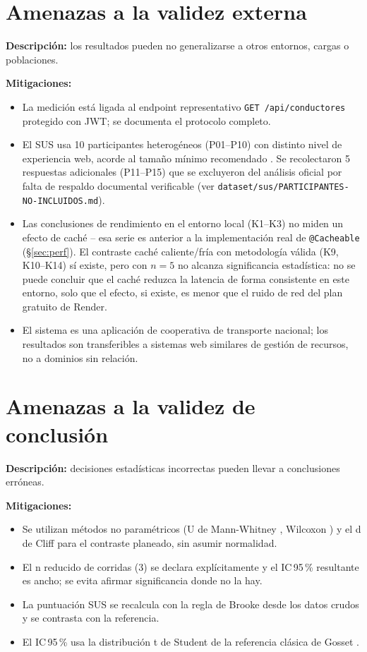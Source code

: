 \section{Amenazas a la validez externa}

\textbf{Descripción:} los resultados pueden no generalizarse a otros entornos,
cargas o poblaciones.

\textbf{Mitigaciones:}
\begin{itemize}
  \item La medición está ligada al endpoint representativo \texttt{GET /api/conductores}
        protegido con JWT; se documenta el protocolo completo.
  \item El SUS usa 10 participantes heterogéneos (P01--P10) con distinto nivel de
        experiencia web, acorde al tamaño mínimo recomendado
        \cite{kortum2013,lewis2009}. Se recolectaron 5 respuestas adicionales
        (P11--P15) que se excluyeron del análisis oficial por falta de respaldo
        documental verificable (ver \texttt{dataset/sus/PARTICIPANTES-NO-INCLUIDOS.md}).
  \item Las conclusiones de rendimiento en el entorno local (K1--K3) no miden
        un efecto de caché -- esa serie es anterior a la implementación real
        de \texttt{@Cacheable} (\S\ref{sec:perf}). El contraste caché
        caliente/fría con metodología válida (K9, K10--K14) sí existe, pero
        con $n=5$ no alcanza significancia estadística: no se puede concluir
        que el caché reduzca la latencia de forma consistente en este
        entorno, solo que el efecto, si existe, es menor que el ruido de red
        del plan gratuito de Render.
  \item El sistema es una aplicación de cooperativa de transporte nacional; los
        resultados son transferibles a sistemas web similares de gestión de
        recursos, no a dominios sin relación.
\end{itemize}

\section{Amenazas a la validez de conclusión}

\textbf{Descripción:} decisiones estadísticas incorrectas pueden llevar a
conclusiones erróneas.

\textbf{Mitigaciones:}
\begin{itemize}
  \item Se utilizan métodos no paramétricos (U de Mann-Whitney \cite{mann_whitney1947},
        Wilcoxon \cite{wilcoxon1945}) y el d de Cliff \cite{cliff1993} para el
        contraste planeado, sin asumir normalidad.
  \item El n reducido de corridas (3) se declara explícitamente y el IC\,95\,\%
        resultante es ancho; se evita afirmar significancia donde no la hay.
  \item La puntuación SUS se recalcula con la regla de Brooke desde los datos
        crudos y se contrasta con la referencia.
  \item El IC\,95\,\% usa la distribución t de Student de la referencia clásica
        de Gosset \cite{student1908}.
\end{itemize}

